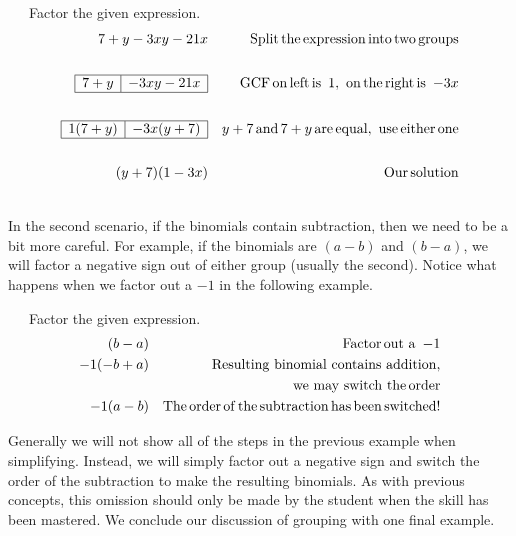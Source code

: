 \begin{example}~~~Factor the given expression.
  \begin{eqnarray*}
    7 + y - 3 x y - 21 x &  & \operatorname{Split} \operatorname{the} \operatorname{expression}
    \operatorname{into} \operatorname{two} \operatorname{groups}\\
&&\\
    \begin{array}{|l|l|}
      \hline
      7 + y & - 3 x y - 21 x\\
      \hline
    \end{array} &  & \operatorname{GCF} \operatorname{on} \operatorname{left} \operatorname{is~} 1, \operatorname{~on}
    \operatorname{the} \operatorname{right} \operatorname{is~} - 3 x\\
&&\\
    \begin{array}{|l|l|}
      \hline
      1 (7 + y) & - 3 x (y + 7)\\
      \hline
    \end{array} &  & y + 7 \operatorname{and} 7 + y \operatorname{are} \operatorname{equal},
    \operatorname{~use} \operatorname{either} \operatorname{one}\\
&&\\
    (y + 7) (1 - 3 x) &  & \operatorname{Our} \operatorname{solution}
  \end{eqnarray*}
\end{example}
~\\
In the second scenario, if the binomials contain subtraction, then we need to be a bit more
careful. For example, if the binomials are $(a - b)$ and $(b - a)$, we will
factor a negative sign out of either group (usually the second). Notice
what happens when we factor out a $-1$ in the following example.

\begin{example}~~~Factor the given expression.
  \begin{eqnarray*}
    (b - a) &  & \operatorname{Factor} \operatorname{out~a~} - 1\\
    - 1 (- b + a) &  & \operatorname{Resulting~binomial~contains~addition},\\
		&&~~~\operatorname{we~may~switch~the} \operatorname{order}\\
    - 1 (a - b) &  & \operatorname{The} \operatorname{order} \operatorname{of} \operatorname{the}
    \operatorname{subtraction} \operatorname{has} \operatorname{been} \operatorname{switched} !
  \end{eqnarray*}
\end{example}
  
Generally we will not show all of the steps in the previous example when simplifying.  Instead, we will simply factor out a negative sign and switch the order of the subtraction to make the resulting binomials.  As with previous concepts, this omission should only be made by the student when the skill has been mastered.  We conclude our discussion of grouping with one final example.


